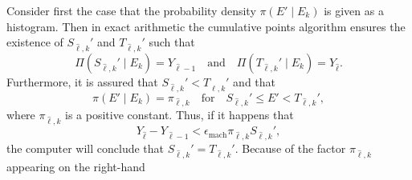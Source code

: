 Consider first the case that the probability density $\pi(E' \mid E_k )$ is
given as a histogram.  Then in exact arithmetic the cumulative points algorithm 
ensures the existence of $S_{\widehat \ell,k}' $ and $T_{\widehat \ell,k}' $
such that
\begin{equation}
  \Pi(S_{\widehat \ell,k}' \mid E_k ) = Y_{\widehat \ell-1}
  \quad \text{and} \quad
  \Pi(T_{\widehat \ell,k}' \mid E_k ) = Y_{\widehat \ell}.
 \label{get-S-T}
\end{equation}
Furthermore, it is assured that $S_{\widehat \ell,k}'  < T_{\widehat \ell,k}' $
and that
$$
  \pi(E' \mid E_k ) = \pi_{\widehat \ell,k}
  \quad \text{for} \quad
  S_{\widehat \ell,k}' \le E' < T_{\widehat \ell,k}',
$$
where $\pi_{\widehat \ell,k}$  is a positive constant.  Thus, if it happens
that
\begin{equation}
  Y_{\widehat \ell} - Y_{\widehat \ell-1} <
  \epsilon_{\text{mach}}  \pi_{\widehat \ell,k} S_{\widehat \ell,k}' ,
 \label{bad-cum-prob}
\end{equation}
the computer will conclude that $S_{\widehat \ell,k}' = T_{\widehat \ell,k}'$.
Because of the factor $\pi_{\widehat \ell,k}$ appearing on the right-hand
